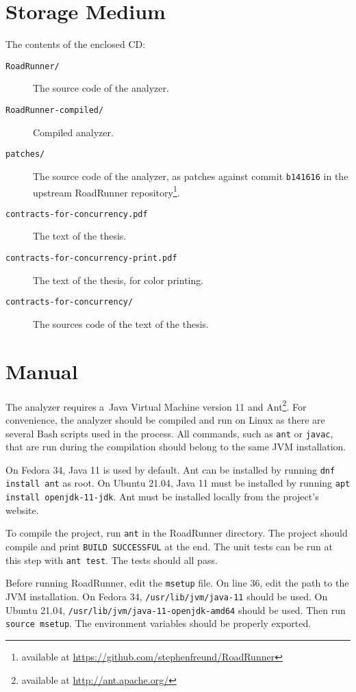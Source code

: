 \chapter{Storage Medium}
\label{storage}

The contents of the enclosed CD:
\begin{description}
    \item [\texttt{RoadRunner/}] The source code of the analyzer.
    \item [\texttt{RoadRunner-compiled/}] Compiled analyzer.
    \item [\texttt{patches/}] The source code of the analyzer, as patches
        against commit \texttt{b141616} in the upstream RoadRunner
        repository\footnote{available at
        \url{https://github.com/stephenfreund/RoadRunner}}.
    \item [\texttt{contracts-for-concurrency.pdf}] The text of the
        thesis.
    \item [\texttt{contracts-for-concurrency-print.pdf}] The text of
        the thesis, for color printing.
    \item [\texttt{contracts-for-concurrency/}] The sources code of the text of
        the thesis.
\end{description}

\chapter{Manual}
\label{manual}

The analyzer requires a~Java Virtual Machine version 11 and
Ant\footnote{available at \url{http://ant.apache.org/}}. For
convenience, the analyzer should be compiled and run on Linux as there are
several Bash scripts used in the process. All commands, such as \texttt{ant} or
\texttt{javac}, that are run during the compilation should belong to the same
JVM installation.

On Fedora 34, Java 11 is used by default. Ant can be installed by running
\texttt{dnf install ant} as root. On Ubuntu 21.04, Java 11 must be installed by
running \texttt{apt install openjdk-11-jdk}. Ant must be installed locally from
the project's website.

To compile the project, run \texttt{ant} in the RoadRunner directory. The
project should compile and print \texttt{BUILD SUCCESSFUL} at the end. The unit
tests can be run at this step with \texttt{ant test}. The tests should all pass.

Before running RoadRunner, edit the \texttt{msetup} file. On line 36, edit the
path to the JVM installation. On Fedora 34, \texttt{/usr/lib/jvm/java-11} should
be used. On Ubuntu 21.04, \texttt{/usr/lib/jvm/java-11-openjdk-amd64} should be
used. Then run \texttt{source msetup}. The environment variables should be
properly exported.

